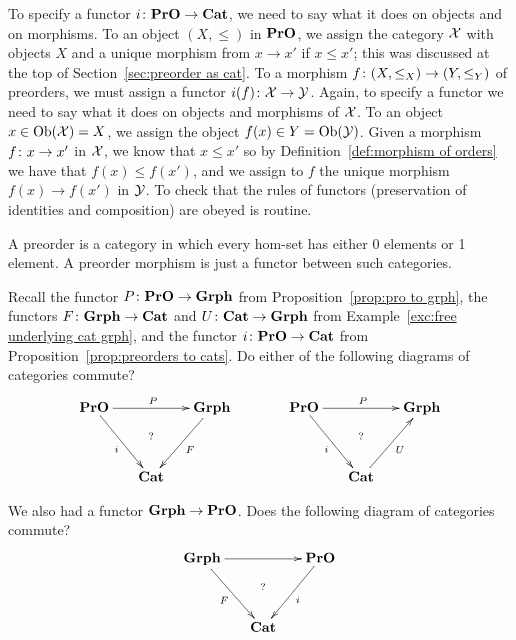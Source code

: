 \documentclass[CT4S-EN-RU]{subfiles}
\begin{document}
\begin{propositionRUS}\label{prop:preorders to cats}
\end{propositionRUS}

\begin{proofENG}
To specify a functor $i\colon{\mathbf{PrO}}\rightarrow{\mathbf{Cat}}$, we need to say what it does on objects and on morphisms. To an object $(X,\leq)$ in ${\mathbf{PrO}}$, we assign the category $\mathcal{X}$ with objects $X$ and a unique morphism from $x\to x'$ if $x\leq x'$; this was discussed at the top of Section~\ref{sec:preorder as cat}. To a morphism $f\colon(X,\leq_X)\rightarrow(Y,\leq_Y)$ of preorders, we must assign a functor $i(f)\colon\mathcal{X}\rightarrow\mathcal{Y}$. Again, to specify a functor we need to say what it does on objects and morphisms of $\mathcal{X}$. To an object $x\in\textnormal{Ob}(\mathcal{X})=X$, we assign the object $f(x)\in Y=\textnormal{Ob}(\mathcal{Y})$. Given a morphism $f\colon x\rightarrow x'$ in $\mathcal{X}$, we know that $x\leq x'$ so by Definition~\ref{def:morphism of orders} we have that $f(x)\leq f(x')$, and we assign to $f$ the unique morphism $f(x)\to f(x')$ in $\mathcal{Y}$. To check that the rules of functors (preservation of identities and composition) are obeyed is routine.
\end{proofENG}

\begin{proofRUS}
\end{proofRUS}

\begin{sloganENG}
A preorder is a category in which every hom-set has either 0 elements or 1 element. A preorder morphism is just a functor between such categories.
\end{sloganENG}

\begin{sloganRUS}
\end{sloganRUS}

\begin{exerciseENG}
Recall the functor $P\colon{\mathbf{PrO}}\rightarrow{\mathbf{Grph}}$ from Proposition~\ref{prop:pro to grph}, the functors $F\colon{\mathbf{Grph}}\rightarrow{\mathbf{Cat}}$ and $U\colon{\mathbf{Cat}}\rightarrow{\mathbf{Grph}}$ from Example~\ref{exc:free underlying cat grph}, and the functor $i\colon{\mathbf{PrO}}\rightarrow{\mathbf{Cat}}$ from Proposition~\ref{prop:preorders to cats}.
\sexc Do either of the following diagrams of categories commute?
$$
\xymatrix@=15pt{\PrO\ar[rr]^P\ar[rdd]_i&\ar@{}[dd]|(.4)?&\Grph\ar[ldd]^F\\\\&\Cat}
\hspace{.5in}
\xymatrix@=15pt{\PrO\ar[rr]^P\ar[rdd]_i&\ar@{}[dd]|(.4)?&\Grph\\\\&\Cat\ar[uur]_U}
$$
\item We also had a functor ${\mathbf{Grph}}\rightarrow{\mathbf{PrO}}$. Does the following diagram of categories commute?
$$
\xymatrix@=15pt{\Grph\ar[rr]\ar[rdd]_F&\ar@{}[dd]|(.4)?&\PrO\ar[ldd]^i\\\\&\Cat}
$$
\endsexc
\end{exerciseENG}
\end{document}
